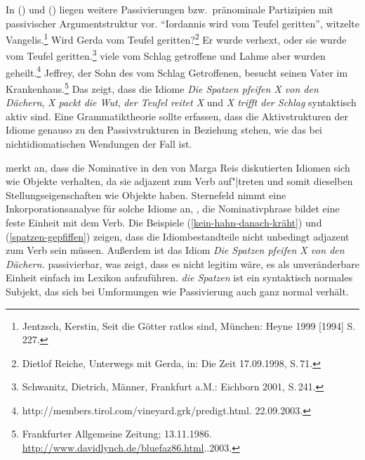 \noindent
In () und () liegen weitere Passivierungen bzw.\ pränominale Partizipien mit passivischer
Argumentstruktur vor.
\eal
\label{vom-teufel-geritten}
\ex 
"`Iordannis wird vom Teufel geritten"', witzelte Vangelis.\footnote{
Jentzsch, Kerstin, Seit die Götter ratlos sind, München: Heyne 1999 [1994] S.\,227.
}
\ex Wird Gerda vom Teufel geritten?\footnote{
Dietlof Reiche, Unterwegs mit Gerda, in: Die Zeit 17.09.1998, S.\,71.
}
\ex
Er wurde verhext, oder sie wurde vom Teufel geritten.\footnote{
Schwanitz, Dietrich, Männer, Frankfurt a.M.: Eichborn 2001, S.\,241.
}
\zl
\eal
\ex viele vom Schlag getroffene und Lahme aber wurden geheilt.\footnote{
        http://members.tirol.com/vineyard.grk/predigt.html. 22.09.2003.
}
\ex Jeffrey, der Sohn des vom Schlag Getroffenen, besucht seinen Vater im Krankenhaus.\footnote{
         Frankfurter Allgemeine Zeitung; 13.11.1986. \url{http://www.davidlynch.de/bluefaz86.html}..2003.%
}
\zl
Das zeigt, dass die Idiome \emph{Die Spatzen pfeifen X von den Dächern}, \emph{X packt die Wut},
\emph{der Teufel reitet X} und \emph{X trifft der Schlag} syntaktisch aktiv sind. Eine Grammatiktheorie
sollte erfassen, dass die Aktivstrukturen der Idiome genauso zu den Passivstrukturen in Beziehung stehen,
wie das bei nichtidiomatischen Wendungen der Fall ist.
\largerpage

\citet[]{Sternefeld85a} merkt an, dass die Nominative in den von Marga Reis
diskutierten Idiomen sich wie Objekte verhalten, da sie adjazent
zum Verb auf"|treten und somit dieselben Stellungseigenschaften wie Objekte haben.
Sternefeld nimmt eine Inkorporationsanalyse für solche Idiome an,
\dash, die Nominativphrase bildet eine feste Einheit mit dem Verb.
Die Beispiele (\ref{kein-hahn-danach-kräht}) und (\ref{spatzen-gepfiffen}) zeigen, dass die Idiombestandteile nicht unbedingt
adjazent zum Verb sein müssen. Außerdem ist das Idiom \emph{Die Spatzen pfeifen X von den Dächern.} passivierbar, was zeigt, dass
es nicht legitim wäre, es als unveränderbare Einheit einfach im Lexikon aufzuführen.
\emph{die Spatzen} ist ein syntaktisch normales Subjekt, das sich bei Umformungen
wie Passivierung auch ganz normal verhält.

